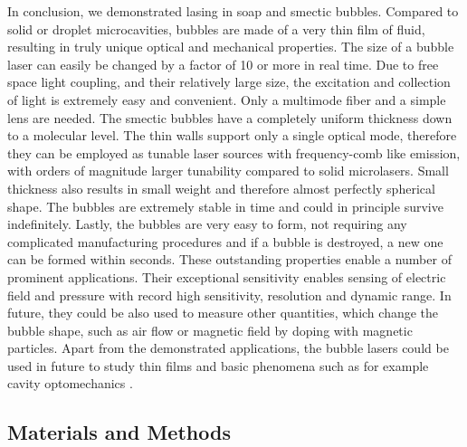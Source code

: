 \documentclass[a4paper,12pt]{article}
\begin{document}
	In conclusion, we demonstrated lasing in soap and smectic bubbles. Compared to solid or droplet microcavities, bubbles are made of a very thin film of fluid, resulting in truly unique optical and mechanical properties. The size of a bubble laser can easily be changed by a factor of 10 or more in real time. Due to free space light coupling, and their relatively large size, the excitation and collection of light is extremely easy and convenient. Only a multimode fiber and a simple lens are needed. The smectic bubbles have a completely uniform thickness down to a molecular level. The thin walls support only a single optical mode, therefore they can be employed as tunable laser sources with frequency-comb like emission, with orders of magnitude larger tunability compared to solid microlasers. Small thickness also results in small weight and therefore almost perfectly spherical shape. The bubbles are extremely stable in time and could in principle survive indefinitely. Lastly, the bubbles are very easy to form, not requiring any complicated manufacturing procedures and if a bubble is destroyed, a new one can be formed within seconds. These outstanding properties enable a number of prominent applications. Their exceptional sensitivity enables sensing of electric field and pressure with record high sensitivity, resolution and dynamic range. In future, they could be also used to measure other quantities, which change the bubble shape, such as air flow or magnetic field by doping with magnetic particles. Apart from the demonstrated applications, the bubble lasers could be used in future to study thin films and basic phenomena such as for example cavity optomechanics \cite{aspelmeyer2014cavity,kim2013cavity,asano2016observation}.
	
	
	\subsection*{Materials and Methods}
	
\end{document}
